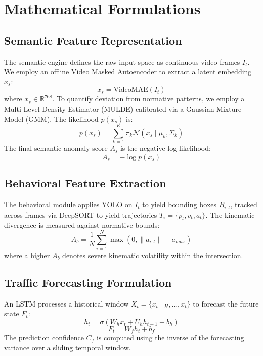 \documentclass[journal]{IEEEtran}
\begin{document}
\section{Mathematical Formulations}
\label{sec:mathematical_formulations}

\subsection{Semantic Feature Representation}
The semantic engine defines the raw input space as continuous video frames $I_t$. We employ an offline Video Masked Autoencoder to extract a latent embedding $x_s$:
\begin{equation}
x_s = \text{VideoMAE}(I_t)
\end{equation}
where $x_s \in \mathbb{R}^{768}$. To quantify deviation from normative patterns, we employ a Multi-Level Density Estimator (MULDE) calibrated via a Gaussian Mixture Model (GMM). The likelihood $p(x_s)$ is:
\begin{equation}
p(x_s) = \sum_{k=1}^{K} \pi_k \mathcal{N}(x_s \mid \mu_k, \Sigma_k)
\end{equation}
The final semantic anomaly score $A_s$ is the negative log-likelihood:
\begin{equation}
A_s = -\log p(x_s)
\end{equation}

\subsection{Behavioral Feature Extraction}
The behavioral module applies YOLO on $I_t$ to yield bounding boxes $B_{i,t}$, tracked across frames via DeepSORT to yield trajectories $T_{i} = \{p_t, v_t, a_t\}$. The kinematic divergence is measured against normative bounds:
\begin{equation}
A_b = \frac{1}{N} \sum_{i=1}^{N} \max\left(0, \|a_{i,t}\| - a_{max}\right)
\end{equation}
where a higher $A_b$ denotes severe kinematic volatility within the intersection.

\subsection{Traffic Forecasting Formulation}
An LSTM processes a historical window $X_t = \{x_{t-H}, \dots, x_t\}$ to forecast the future state $F_t$:
\begin{equation}
h_t = \sigma(W_h x_t + U_h h_{t-1} + b_h)
\end{equation}
\begin{equation}
F_t = W_f h_t + b_f
\end{equation}
The prediction confidence $C_f$ is computed using the inverse of the forecasting variance over a sliding temporal window.
\end{document}
